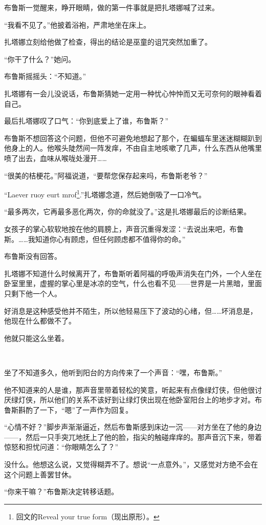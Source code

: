 \documentclass[../main.tex]{subfiles}
\begin{document}
布鲁斯一觉醒来，睁开眼睛，做的第一件事就是把扎塔娜喊了过来。

“我看不见了。”他披着浴袍，严肃地坐在床上。

扎塔娜立刻给他做了检查，得出的结论是巫童的诅咒突然加重了。

“你干了什么？”她问。

布鲁斯摇摇头：“不知道。”

扎塔娜有一会儿没说话，布鲁斯猜她一定用一种忧心忡忡而又无可奈何的眼神看着自己。

最后扎塔娜叹了口气：“你到底爱上了谁，布鲁斯？”

布鲁斯不想回答这个问题，但他不可避免地想起了那个，在蝙蝠车里迷迷糊糊趴到他身上的人。他喉头陡然间一阵发痒，不由自主地咳嗽了几声，什么东西从他嘴里喷了出去，血味从喉咙处漫开……

“很美的桔梗花。”阿福说道，“要帮您保存起来吗，布鲁斯老爷？”

“Laever ruoy eurt mrof\footnote[1]{回文的Reveal your true form（现出原形）。}.”扎塔娜念道，然后她倒吸了一口冷气。

“最多两次，它再最多恶化两次，你的命就没了。”这是扎塔娜最后的诊断结果。

女孩子的掌心软软地按在他的肩膀上，声音沉重得发涩：“去说出来吧，布鲁斯。……我知道你心有顾虑，但任何顾虑都不值得你的命。”

布鲁斯没有回答。

扎塔娜不知道什么时候离开了，布鲁斯听着阿福的呼吸声消失在门外，一个人坐在卧室里里，虚握的掌心里是冰凉的空气，什么也看不见——世界是一片黑暗，里面只剩下他一个人。

好消息是这种感受他并不陌生，所以他轻易压下了波动的心绪，但……坏消息是，他现在什么都做不了。

他就只能这么坐着。

~\

坐了不知道多久，他听到阳台的方向传来了一个声音：“嘿，布鲁斯。”

他不知道来的人是谁，那声音里带着轻松的笑意，听起来有点像绿灯侠，但他很讨厌绿灯侠，所以他们的关系不该好到让绿灯侠出现在他卧室阳台上的地步才对。布鲁斯斟酌了一下，“嗯”了一声作为回复。

“心情不好？”脚步声渐渐逼近，然后布鲁斯感到床边一沉——对方坐在了他的身边——，然后一只手突兀地抚上了他的脸，指尖的触碰痒痒的。那声音沉下来，带着惊怒和担忧问道：“你眼睛怎么了？”

没什么。他想这么说，又觉得糊弄不了。想说“一点意外。”，又感觉对方绝不会在这个问题上善罢甘休。

“你来干嘛？”布鲁斯决定转移话题。
\end{document}
